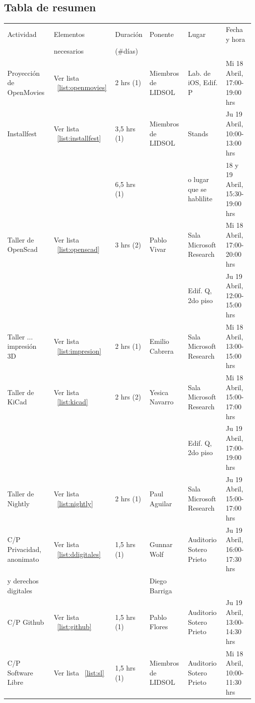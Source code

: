 \documentclass[a4paper,11pt]{article}                 %
\begin{document}
  \begin{landscape}



  \section*{Tabla de resumen}
 
  
  \begin{table}[H]
\centering

\begin{tabular}{|l|l|l|l|l|l|}
\hline
 Actividad & Elementos & Duración  & Ponente & Lugar & Fecha y hora \\
   & necesarios & (\#días) &  &  &  \\ \hline 
 Proyección de OpenMovies & Ver lista ~\ref{list:openmovies}  & 2 hrs (1) & Miembros de LIDSOL & Lab. de iOS, Edif. P &  Mi 18 Abril, 17:00-19:00 hrs \\ \hline 
 Installfest & Ver lista ~\ref{list:installfest}  & 3,5 hrs (1)  & Miembros de LIDSOL & Stands & Ju 19 Abril, 10:00-13:00 hrs\\ 
   &  & 6,5 hrs (1)&  & o lugar que se hablilite & 18 y 19 Abril, 15:30-19:00 hrs\\ \hline 
 Taller de OpenScad & Ver lista ~\ref{list:openscad} & 3 hrs (2) & Pablo Vivar & Sala Microsoft Research &  Mi 18 Abril, 17:00-20:00 hrs \\ 
  &  & &  & Edif. Q, 2do piso & Ju 19 Abril, 12:00-15:00 hrs\\ \hline
Taller ... impresión 3D & Ver lista ~\ref{list:impresion} & 2 hrs (1) & Emilio Cabrera & Sala Microsoft Research & Mi 18 Abril, 13:00-15:00 hrs \\ \hline
 Taller de KiCad & Ver lista ~\ref{list:kicad}  & 2 hrs (2) & Yesica Navarro & Sala Microsoft Research & Mi 18 Abril, 15:00-17:00 hrs  \\
    &  & &  & Edif. Q, 2do piso & Ju 19 Abril, 17:00-19:00 hrs\\  \hline
 Taller de Nightly & Ver lista ~\ref{list:nightly} & 2 hrs (1) & Paul Aguilar & Sala Microsoft Research & Ju 19 Abril, 15:00-17:00 hrs \\ \hline

C/P Privacidad, anonimato & Ver lista ~\ref{list:ddigitales} & 1,5 hrs (1) & Gunnar Wolf & Auditorio Sotero Prieto & Ju 19 Abril, 16:00-17:30 hrs \\ 
  y derechos digitales  &  & &  Diego Barriga &  & \\  \hline
C/P Github & Ver lista ~\ref{list:github} & 1,5 hrs (1) & Pablo Flores & Auditorio Sotero Prieto & Ju 19 Abril, 13:00-14:30 hrs \\ \hline
C/P Software Libre & Ver lista ~\ref{list:sl} & 1,5 hrs (1) & Miembros de LIDSOL & Auditorio Sotero Prieto & Mi 18 Abril, 10:00-11:30 hrs \\  \hline


\end{tabular}
\end{table}
\end{landscape}
\end{document}
